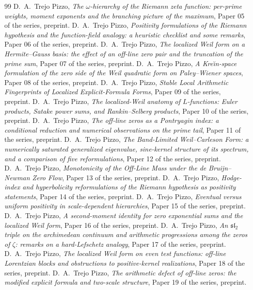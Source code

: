 \documentclass[11pt]{amsart}
\theoremstyle{definition}
\theoremstyle{remark}
\numberwithin{equation}{section}
\begin{document}
\begin{thebibliography}{99}
 D.~A.~Trejo Pizzo, \emph{The $\omega$-hierarchy of the Riemann zeta function: per-prime weights, moment exponents and the branching picture of the maximum}, Paper 05 of the series, preprint.
 D.~A.~Trejo Pizzo, \emph{Positivity formulations of the Riemann hypothesis and the function-field analogy: a heuristic checklist and some remarks}, Paper 06 of the series, preprint.
 D.~A.~Trejo Pizzo, \emph{The localized Weil form on a Hermite--Gauss basis: the effect of an off-line zero pair and the truncation of the prime sum}, Paper 07 of the series, preprint.
 D.~A.~Trejo Pizzo, \emph{A Kre\u{\i}n-space formulation of the zero side of the Weil quadratic form on Paley--Wiener spaces}, Paper 08 of the series, preprint.
 D.~A.~Trejo Pizzo, \emph{Stable Local Arithmetic Fingerprints of Localized Explicit-Formula Forms}, Paper 09 of the series, preprint.
 D.~A.~Trejo Pizzo, \emph{The localized-Weil anatomy of $L$-functions: Euler products, Satake power sums, and Rankin--Selberg products}, Paper 10 of the series, preprint.
 D.~A.~Trejo Pizzo, \emph{The off-line zeros as a Pontryagin index: a conditional reduction and numerical observations on the prime tail}, Paper 11 of the series, preprint.
 D.~A.~Trejo Pizzo, \emph{The Band-Limited Weil--Carleson Form: a numerically saturated generalized eigenvalue, sine-kernel structure of its spectrum, and a comparison of five reformulations}, Paper 12 of the series, preprint.
 D.~A.~Trejo Pizzo, \emph{Monotonicity of the Off-Line Mass under the de Bruijn--Newman Zero Flow}, Paper 13 of the series, preprint.
 D.~A.~Trejo Pizzo, \emph{Hodge-index and hyperbolicity reformulations of the Riemann hypothesis as positivity statements}, Paper 14 of the series, preprint.
 D.~A.~Trejo Pizzo, \emph{Eventual versus uniform positivity in scale-dependent hierarchies}, Paper 15 of the series, preprint.
 D.~A.~Trejo Pizzo, \emph{A second-moment identity for zero exponential sums and the localized Weil form}, Paper 16 of the series, preprint.
 D.~A.~Trejo Pizzo, \emph{An $\mathfrak{sl}_2$ triple on the archimedean continuum and arithmetic progressions among the zeros of $\zeta$: remarks on a hard-Lefschetz analogy}, Paper 17 of the series, preprint.
 D.~A.~Trejo Pizzo, \emph{The localized Weil form on even test functions: off-line Lorentzian blocks and obstructions to positive-kernel realizations}, Paper 18 of the series, preprint.
 D.~A.~Trejo Pizzo, \emph{The arithmetic defect of off-line zeros: the modified explicit formula and two-scale structure}, Paper 19 of the series, preprint.

\end{thebibliography}
\end{document}
